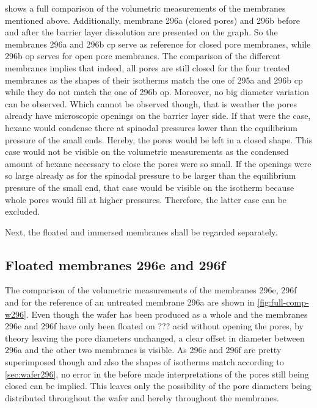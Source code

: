 \documentclass[thesis.tex]{subfiles}
\begin{document}
         shows a full comparison of the volumetric measurements of the membranes mentioned above. Additionally, membrane 296a (closed pores) and 296b before and after the barrier layer dissolution are presented on the graph. So the membranes 296a and 296b cp serve as reference for closed pore membranes, while 296b op serves for open pore membranes. The comparison of the different membranes implies that indeed, all pores are still closed for the four treated membranes as the shapes of their isotherms match the one of 295a and 296b cp while they do not match the one of 296b op. Moreover, no big diameter variation can be observed. Which cannot be observed though, that is weather the pores already have microscopic openings on the barrier layer side. If that were the case, hexane would condense there at spinodal pressures lower than the equilibrium pressure of the small ends. Hereby, the pores would be left in a closed shape. This case would not be visible on the volumetric measurements as the condensed amount of hexane necessary to close the pores were so small. If the openings were so large already as for the spinodal pressure to be larger than the equilibrium pressure of the small end, that case would be visible on the isotherm because whole pores would fill at higher pressures. Therefore, the latter case can be excluded.

        Next, the floated and immersed membranes shall be regarded separately.

        


        \subsection{Floated membranes 296e and 296f}
        \label{subsec:floated-membranes}

            The comparison of the volumetric measurements of the membranes 296e, 296f and for the reference of an untreated membrane 296a are shown in \cref{fig:full-comp-w296}. Even though the wafer has been produced as a whole and the membranes 296e and 296f have only been floated on ??? acid without opening the pores, by theory leaving the pore diameters unchanged, a clear offset in diameter between 296a and the other two membranes is visible. As 296e and 296f are pretty superimposed though and also the shapes of isotherms match according to \cref{sec:wafer296}, no error in the before made interpretations of the pores still being closed can be implied. This leaves only the possibility of the pore diameters being distributed throughout the wafer and hereby throughout the membranes.
\end{document}
